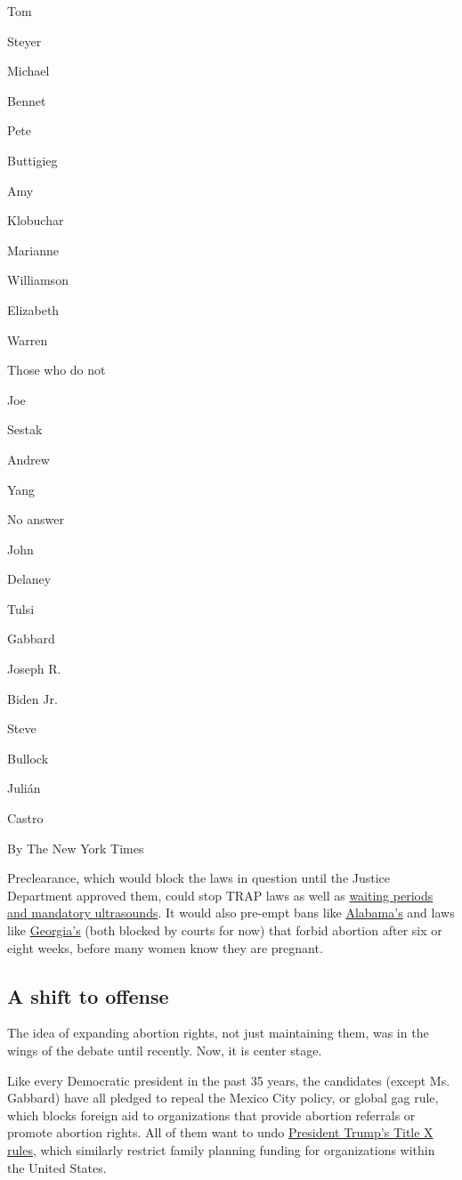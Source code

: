 Tom

Steyer

Michael

Bennet

Pete

Buttigieg

Amy

Klobuchar

Marianne

Williamson

Elizabeth

Warren

Those who do not

Joe

Sestak

Andrew

Yang

No answer

John

Delaney

Tulsi

Gabbard

Joseph R.

Biden Jr.

Steve

Bullock

Julián

Castro

By The New York Times

Preclearance, which would block the laws in question until the Justice
Department approved them, could stop TRAP laws as well as
\href{https://www.nytimes3xbfgragh.onion/interactive/2018/07/20/us/mississippi-abortion-restrictions.html}{waiting
periods and mandatory ultrasounds}. It would also pre-empt bans like
\href{https://www.nytimes3xbfgragh.onion/2019/10/29/us/alabama-abortion-ban.html}{Alabama's}
and laws like
\href{https://www.nytimes3xbfgragh.onion/2019/10/01/us/Georgia-abortion-law.html}{Georgia's}
(both blocked by courts for now) that forbid abortion after six or eight
weeks, before many women know they are pregnant.

\hypertarget{a-shift-to-offense}{%
\subsection{A shift to offense}\label{a-shift-to-offense}}

The idea of expanding abortion rights, not just maintaining them, was in
the wings of the debate until recently. Now, it is center stage.

Like every Democratic president in the past 35 years, the candidates
(except Ms. Gabbard) have all pledged to repeal the Mexico City policy,
or global gag rule, which blocks foreign aid to organizations that
provide abortion referrals or promote abortion rights. All of them want
to undo
\href{https://www.nytimes3xbfgragh.onion/2019/02/22/health/trump-defunds-planned-parenthood.html}{President
Trump's Title X rules}, which similarly restrict family planning funding
for organizations within the United States.

